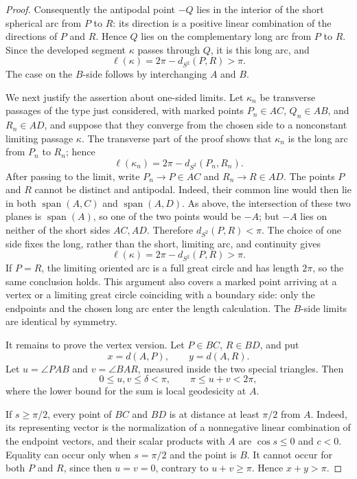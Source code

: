 \documentclass[12pt,a4paper]{article}
\theoremstyle{definition}
\begin{document}
\begin{proof}
Consequently the antipodal point \(-Q\) lies in the interior of the short
spherical arc from \(P\) to \(R\): its direction is a positive linear
combination of the directions of \(P\) and \(R\).  Hence \(Q\) lies on the
complementary long arc from \(P\) to \(R\).  Since the developed segment
\(\kappa\) passes through \(Q\), it is this long arc, and
\[
        \ell(\kappa)=2\pi-d_{S^2}(P,R)>\pi.
\]
The case on the \(B\)-side follows by interchanging \(A\) and \(B\).

We next justify the assertion about one-sided limits.  Let
\(\kappa_n\) be transverse passages of the type just considered, with marked
points \(P_n\in AC\), \(Q_n\in AB\), and \(R_n\in AD\), and suppose that they
converge from the chosen side to a nonconstant limiting passage \(\kappa\).
The transverse part of the proof shows that \(\kappa_n\) is the long arc from
\(P_n\) to \(R_n\); hence
\[
        \ell(\kappa_n)=2\pi-d_{S^2}(P_n,R_n).
\]
After passing to the limit, write \(P_n\to P\in AC\) and
\(R_n\to R\in AD\).  The points \(P\) and \(R\) cannot be distinct and
antipodal.  Indeed, their common line would then lie in both
\(\operatorname{span}(A,C)\) and \(\operatorname{span}(A,D)\).  As above, the
intersection of these two planes is \(\operatorname{span}(A)\), so one of the
two points would be \(-A\); but \(-A\) lies on neither of the short sides
\(AC,AD\).  Therefore \(d_{S^2}(P,R)<\pi\).  The choice of one side fixes the
long, rather than the short, limiting arc, and continuity gives
\[
        \ell(\kappa)=2\pi-d_{S^2}(P,R)>\pi.
\]
If \(P=R\), the limiting oriented arc is a full great circle and has length
\(2\pi\), so the same conclusion holds.  This argument also covers a marked
point arriving at a vertex or a limiting great circle coinciding with a
boundary side: only the endpoints and the chosen long arc enter the length
calculation.  The \(B\)-side limits are identical by symmetry.

It remains to prove the vertex version. Let \(P\in BC\), \(R\in BD\), and
put
\[
        x=d(A,P),\qquad y=d(A,R).
\]
Let \(u=\angle PAB\) and \(v=\angle BAR\), measured inside the two special
triangles.  Then
\[
        0\le u,v\le\delta<\pi,
        \qquad
        \pi\le u+v<2\pi,
\]
where the lower bound for the sum is local geodesicity at \(A\).

If \(s\ge\pi/2\), every point of \(BC\) and \(BD\) is at distance at least
\(\pi/2\) from \(A\). Indeed, its representing vector is the normalization
of a nonnegative linear combination of the endpoint vectors, and their scalar
products with \(A\) are \(\cos s\le0\) and \(c<0\). Equality can occur only
when \(s=\pi/2\) and the point is \(B\). It cannot occur for both \(P\) and
\(R\), since then \(u=v=0\), contrary to \(u+v\ge\pi\). Hence
\(x+y>\pi\).


\end{proof}
\end{document}
